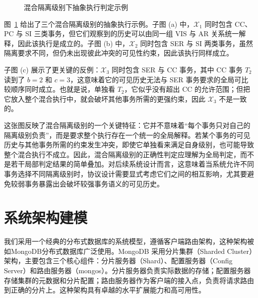 \begin{figure}[htbp]
{%
  }

  \caption{混合隔离级别下抽象执行判定示例}
  \label{fig:mixed-isolation-consistency}
\end{figure}

图~\ref{fig:mixed-isolation-consistency} 给出了三个混合隔离级别的抽象执行示例。子图 (a) 中，$\mathcal{X}_1$ 同时包含 CC、PC 与 SI 三类事务，但它们观察到的历史可以由同一组 $\text{VIS}$ 与 $\text{AR}$ 关系统一解释，因此该执行是成立的。子图 (b) 中，$\mathcal{X}_2$ 同时包含 SER 与 SI 两类事务，虽然隔离要求不同，但仍未出现彼此冲突的可见性约束，因此该执行同样成立。

子图 (c) 展示了更关键的反例：$\mathcal{X}_3$ 同时包含 SER 与 CC 事务，其中 CC 事务 $T_2$ 读到了 $b=2$ 和 $c=3$，这意味着它的可见历史无法与 SER 事务要求的全局可比较顺序同时成立。也就是说，单独看 $T_2$，它似乎没有超出 CC 的允许范围；但把它放入整个混合执行中，就会破坏其他事务所需的更强约束，因此 $\mathcal{X}_3$ 不是一致的。

这张图反映了混合隔离级别的一个关键特征：它并不意味着“每个事务只对自己的隔离级别负责”，而是要求整个执行存在一个统一的全局解释。若某个事务的可见历史与其他事务所需的约束发生冲突，即使它单独看来满足自身级别，也可能导致整个混合执行不成立。因此，混合隔离级别的正确性判定应理解为全局判定，而不是若干局部判定结果的简单叠加。对后续系统设计而言，这意味着当系统允许不同事务选择不同隔离级别时，协议设计需要显式考虑它们之间的相互影响，尤其要避免较弱事务暴露出会破坏较强事务语义的可见历史。


\section{系统架构建模}
我们采用一个经典的分布式数据库的系统模型，遵循客户端路由架构，这种架构被如MongoDB分布式数据库广泛使用。MongoDB 采用分片集群（Sharded Cluster）架构，主要包含三个核心组件：分片服务器（Shard）、配置服务器（Config Server）和路由服务器（mongos）。分片服务器负责实际数据的存储；配置服务器存储集群的元数据和分片配置；路由服务器作为客户端的接入点，负责将请求路由到正确的分片上。这种架构具有卓越的水平扩展能力和高可用性。

